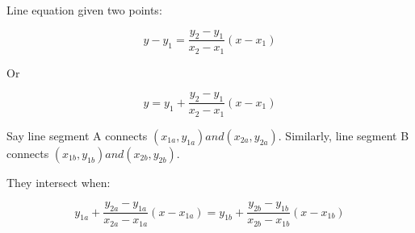 \documentclass[10pt,a4paper]{article}
\begin{document}
Line equation given two points: 

$$ y - y_1 = \frac{y_2 - y_1}{x_2 - x_1} (x - x_1) $$

Or

$$ y = y_1  + \frac{y_2 - y_1}{x_2 - x_1} (x - x_1) $$

Say line segment A connects $ (x_{1a}, y_{1a}) and (x_{2a},y_{2a}) $. Similarly, line segment B connects $ (x_{1b}, y_{1b}) and (x_{2b},y_{2b}) $. 

They intersect when: 

$$ y_{1a}  + \frac{y_{2a} - y_{1a}}{x_{2a} - x_{1a}} (x - x_{1a}) = y_{1b}  + \frac{y_{2b} - y_{1b}}{x_{2b} - x_{1b}} (x - x_{1b})$$
\end{document}
